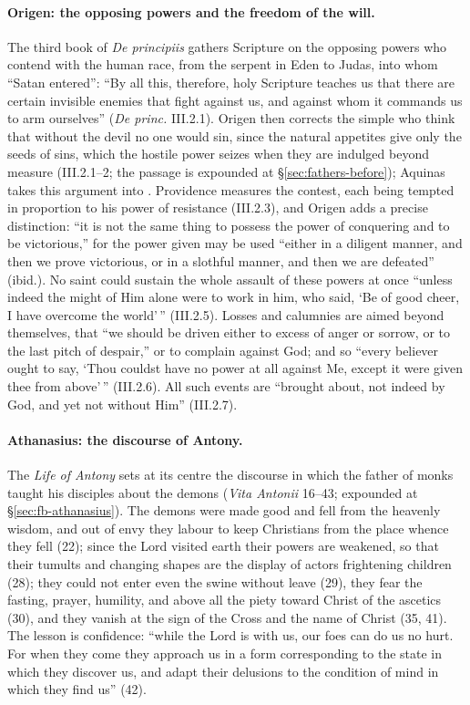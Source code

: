 \paragraph{Origen: the opposing powers and the freedom of the will.} The
third book of \emph{De principiis} gathers Scripture on the opposing powers
who contend with the human race, from the serpent in Eden to Judas, into
whom ``Satan entered'': ``By all this, therefore, holy Scripture teaches us
that there are certain invisible enemies that fight against us, and against
whom it commands us to arm ourselves'' (\emph{De princ.} III.2.1). Origen
then corrects the simple who think that without the devil no one would sin,
since the natural appetites give only the seeds of sins, which the hostile
power seizes when they are indulged beyond measure (III.2.1--2; the passage
is expounded at \S\ref{sec:fathers-before}); Aquinas takes this argument
into . Providence measures the contest, each being tempted
in proportion to his power of resistance (III.2.3), and Origen adds a
precise distinction: ``it is not the same thing to possess the power of
conquering and to be victorious,'' for the power given may be used ``either
in a diligent manner, and then we prove victorious, or in a slothful manner,
and then we are defeated'' (ibid.). No saint could sustain the whole assault
of these powers at once ``unless indeed the might of Him alone were to work
in him, who said, `Be of good cheer, I have overcome the world'\,''
(III.2.5). Losses and calumnies are aimed beyond themselves, that ``we
should be driven either to excess of anger or sorrow, or to the last pitch
of despair,'' or to complain against God; and so ``every believer ought to
say, `Thou couldst have no power at all against Me, except it were given
thee from above'\,'' (III.2.6). All such events are ``brought about, not
indeed by God, and yet not without Him'' (III.2.7).

\paragraph{Athanasius: the discourse of Antony.} The \emph{Life of Antony}
sets at its centre the discourse in which the father of monks taught his
disciples about the demons (\emph{Vita Antonii} 16--43; expounded at
\S\ref{sec:fb-athanasius}). The demons were made good and fell from the
heavenly wisdom, and out of envy they labour to keep Christians from the
place whence they fell (22); since the Lord visited earth their powers are
weakened, so that their tumults and changing shapes are the display of
actors frightening children (28); they could not enter even the swine
without leave (29), they fear the fasting, prayer, humility, and above all
the piety toward Christ of the ascetics (30), and they vanish at the sign
of the Cross and the name of Christ (35, 41). The lesson is confidence:
``while the Lord is with us, our foes can do us no hurt. For when they come
they approach us in a form corresponding to the state in which they
discover us, and adapt their delusions to the condition of mind in which
they find us'' (42).

